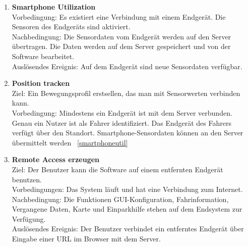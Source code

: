 \documentclass[pflichtenheft.tex]{subfiles}
\begin{document}
\begin{enumerate}
		\item{\textbf{Smartphone Utilization}} \label{smartphoneutil} \\
		Vorbedingung: Es existiert eine Verbindung mit einem Endgerät. Die Sensoren des Endgeräts sind aktiviert. \\ Nachbedingung: Die Sensordaten vom Endgerät werden auf den Server übertragen. Die Daten werden auf dem Server gespeichert und von der Software bearbeitet. \\ Auslösendes Ereignis: Auf dem Endgerät sind neue Sensordaten verfügbar.

		\item{\textbf{Position tracken}}\\
		Ziel: Ein Bewegungsprofil erstsellen, das man mit Sensorwerten verbinden kann.\\
		Vorbedingung: Mindestens ein Endgerät ist mit dem Server verbunden. Genau ein Nutzer ist als Fahrer identifiziert. Das Endgerät des Fahrers verfügt über den Standort. Smartphone-Sensordaten können an den Server übermittelt werden ~\ref{smartphoneutil}

		\renewcommand{\theenumi}{/FA\ifnum \value{enumi}<10 0\fi\arabic{enumi}0/}
		\renewcommand{\labelenumi}{\theenumi}
		\renewcommand{\theenumii}{\arabic{enumii}}
		\renewcommand{\labelenumii}{/FA\ifnum \value{enumi}<10 0\fi\arabic{enumi}\arabic{enumii}/}
		
		\item{\textbf{Remote Access erzeugen}} \label{remote} \\ Ziel: Der Benutzer kann die Software auf einem entfernten Endgerät benutzen.\\ Vorbedingungen: Das System läuft und hat eine Verbindung zum Internet.\\ Nachbedingung: Die Funktionen GUI-Konfiguration, Fahrinformation, Vergangene Daten, Karte und Einparkhilfe stehen auf dem Endsystem zur Verfügung.\\ Auslösendes Ereignis: Der Benutzer verbindet ein entferntes Endgerät über Eingabe einer URL im Browser mit dem Server.
		\setcounter{enumTemp}{\value{enumi}}
	\end{enumerate} 
\end{document}
